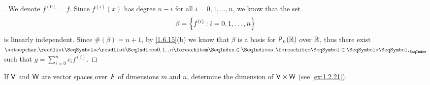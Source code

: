 \begin{proof}[]
  We denote \(f^{(0)} = f\).
  Since \(f^{(i)}(x)\) has degree \(n - i\) for all \(i = 0, 1, \dots, n\), we know that the set
  \[
    \beta = \left\lbrace f^{(i)} : i = 0, 1, \dots, n\right\rbrace
  \]
  is linearly independent.
  Since \(\#(\beta) = n + 1\), by \cref{1.6.15}(b) we know that \(\beta\) is a basis for \(\ps[n]{\R}\) over \(\mathbb{R}\), thus there exist \(\seq{c}{0,1,,n}\) such that \(g = \sum_{i = 0}^n c_i f^{(i)}\).
\end{proof}

\begin{ex}\label{ex:1.6.25}
  If \(\mathsf{V}\) and \(\mathsf{W}\) are vector spaces over \(\mathit{F}\) of dimensions \(m\) and \(n\), determine the dimension of \(\mathsf{V} \times \mathsf{W}\) (see \cref{ex:1.2.21}).
\end{ex}


